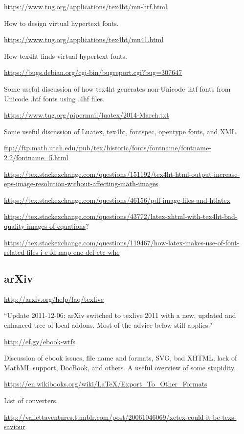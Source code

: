 \documentclass[12pt]{article}
\begin{document}
\url{https://www.tug.org/applications/tex4ht/mn-htf.html}

How to design virtual hypertext fonts.

\url{https://www.tug.org/applications/tex4ht/mn41.html}

How tex4ht finds virtual hypertext fonts.


\url{https://bugs.debian.org/cgi-bin/bugreport.cgi?bug=307647}

Some useful discussion of how tex4ht generates non-Unicode .htf fonts
from Unicode .htf fonts using .4hf files.


\url{https://www.tug.org/pipermail/luatex/2014-March.txt}

Some useful discussion of Luatex, tex4ht, fontspec, opentype fonts,
and XML.


\url{ftp://ftp.math.utah.edu/pub/tex/historic/fonts/fontname/fontname-2.2/fontname_5.html}

\url{https://tex.stackexchange.com/questions/151192/tex4ht-html-output-increase-eps-image-resolution-without-affecting-math-images}

\url{
https://tex.stackexchange.com/questions/46156/pdf-image-files-and-htlatex
}

\url{https://tex.stackexchange.com/questions/43772/latex-xhtml-with-tex4ht-bad-quality-images-of-equations}?

\url{https://tex.stackexchange.com/questions/119467/how-latex-makes-use-of-font-related-files-i-e-fd-map-enc-def-etc-whe}


\subsection{arXiv}
\label{sec:arxiv}

\url{
http://arxiv.org/help/faq/texlive
}

``Update 2011-12-06: arXiv switched to texlive 2011 with a new, updated and enhanced tree of local addons. Most of the advice below still applies.''



\url{http://ef.gy/ebook-wtfs}

Discussion of ebook issues, file name and formats, SVG, bad XHTML,
lack of MathML support, DocBook, and others.  A useful overview of
some stupidity.


\url{https://en.wikibooks.org/wiki/LaTeX/Export_To_Other_Formats}

List of converters.


\url{http://vallettaventures.tumblr.com/post/20061046069/xetex-could-it-be-texs-saviour}
\end{document}
